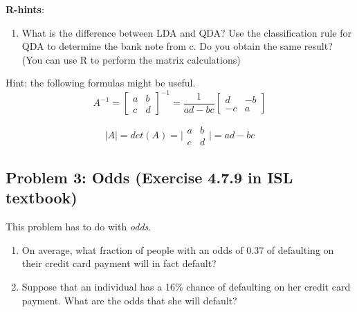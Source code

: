 \documentclass[]{article}
\newenvironment{Shaded}{\begin{snugshade}}{\end{snugshade}}
\newcommand{\KeywordTok}[1]{\textcolor[rgb]{0.13,0.29,0.53}{\textbf{#1}}}
\newcommand{\StringTok}[1]{\textcolor[rgb]{0.31,0.60,0.02}{#1}}
\newcommand{\CommentTok}[1]{\textcolor[rgb]{0.56,0.35,0.01}{\textit{#1}}}
\newcommand{\OperatorTok}[1]{\textcolor[rgb]{0.81,0.36,0.00}{\textbf{#1}}}
\newcommand{\NormalTok}[1]{#1}
\providecommand{\tightlist}{%
  \setlength{\itemsep}{0pt}\setlength{\parskip}{0pt}}
\begin{document}
\textbf{R-hints}:

\begin{Shaded}
\end{Shaded}

\begin{enumerate}
\def\labelenumi{\alph{enumi}.}
\setcounter{enumi}{3}
\tightlist
\item
  What is the difference between LDA and QDA? Use the classification
  rule for QDA to determine the bank note from c. Do you obtain the same
  result? (You can use R to perform the matrix calculations)
\end{enumerate}

Hint: the following formulas might be useful. \[A^{-1} = \left[
\begin{array}{cc} a & b \\ c & d \end{array} 
\right]^{-1} = \frac{1}{ad-bc}
\left[
\begin{array}{cc} d & -b \\ -c & a \end{array} 
\right]\]

\[ |A| = det(A) = \Big|\begin{array}{cc} a & b \\ c & d \end{array}\Big| = ad - bc \]

\subsection{Problem 3: Odds (Exercise 4.7.9 in ISL
textbook)}\label{problem-3-odds-exercise-4.7.9-in-isl-textbook}

This problem has to do with \emph{odds}.

\begin{enumerate}
\def\labelenumi{\alph{enumi}.}
\tightlist
\item
  On average, what fraction of people with an odds of 0.37 of defaulting
  on their credit card payment will in fact default?\\
\item
  Suppose that an individual has a 16\% chance of defaulting on her
  credit card payment. What are the odds that she will default?
\end{enumerate}
\end{document}
